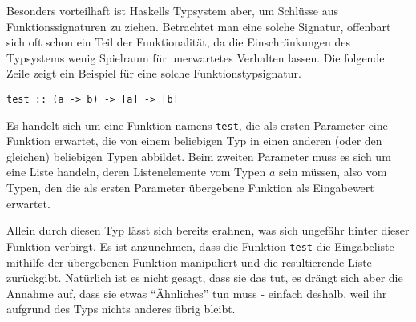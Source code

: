 Besonders vorteilhaft ist Haskells Typsystem aber, um Schlüsse aus Funk\-tions\-sig\-na\-tu\-ren zu ziehen. Betrachtet man eine solche Signatur, offenbart sich oft schon ein Teil der Funktionalität, da die
Einschränkungen des Typsystems wenig Spielraum für unerwartetes Verhalten lassen. Die folgende Zeile zeigt ein Beispiel
für eine solche Funktionstypsignatur.
%

\begin{verbatim}
test :: (a -> b) -> [a] -> [b]
\end{verbatim}

Es handelt sich um eine Funktion namens \texttt{test}, die als ersten Parameter eine Funktion erwartet, die von einem beliebigen
Typ in einen anderen (oder den gleichen) beliebigen Typen abbildet. Beim zweiten Parameter muss es sich um eine Liste handeln,
deren Listenelemente vom Typen $a$ sein müssen, also vom Typen, den die als ersten Parameter übergebene Funktion als
Eingabewert erwartet.

Allein durch diesen Typ lässt sich bereits erahnen, was sich ungefähr hinter dieser Funktion verbirgt.
Es ist anzunehmen, dass die  Funktion \texttt{test} die Eingabeliste mithilfe der übergebenen Funktion manipuliert und die
resultierende Liste zurückgibt. Natürlich ist es nicht gesagt, dass sie das tut, es drängt sich aber die Annahme auf, dass sie
etwas ``Ähnliches'' tun muss - einfach deshalb, weil ihr aufgrund des Typs nichts anderes übrig bleibt. 

